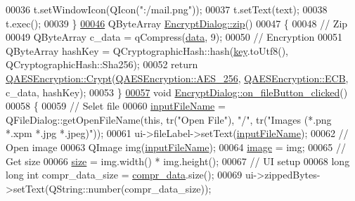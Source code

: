 \begin{DoxyCode}
00036     t.setWindowIcon(QIcon(\textcolor{stringliteral}{":/mail.png"}));
00037     t.setText(text);
00038     t.exec();
00039 \}
\hypertarget{encryptdialog_8cpp_source.tex_l00046}{}\hyperlink{class_encrypt_dialog_a2bff820a3df4ddc36ecb07ed74b7138a}{00046} QByteArray \hyperlink{class_encrypt_dialog_a2bff820a3df4ddc36ecb07ed74b7138a}{EncryptDialog::zip}()
00047 \{
00048     \textcolor{comment}{// Zip}
00049     QByteArray c\_data = qCompress(\hyperlink{class_encrypt_dialog_acf3a8bbce90d99ef17fec093c35b1008}{data}, 9);
00050     \textcolor{comment}{// Encryption}
00051     QByteArray hashKey = QCryptographicHash::hash(\hyperlink{class_encrypt_dialog_a1afdef3c665fb0d0fae06d1df8e84951}{key}.toUtf8(), QCryptographicHash::Sha256);
00052     \textcolor{keywordflow}{return} \hyperlink{class_q_a_e_s_encryption_a43819eeb6a7cb29fbd3cb6ad640dcbdf}{QAESEncryption::Crypt}(\hyperlink{class_q_a_e_s_encryption_abe48208f4f6c7d68e6a10b49b9d0b7bdacde97774ab1d4c609e04b0dd13a1e1f7}{QAESEncryption::AES\_256}, 
      \hyperlink{class_q_a_e_s_encryption_ad3e031c49a3d56566379d75b40b7b255a4ca7f51778e2adf1f464164a0ba8e75e}{QAESEncryption::ECB}, c\_data, hashKey);
00053 \}
\hypertarget{encryptdialog_8cpp_source.tex_l00057}{}\hyperlink{class_encrypt_dialog_ac9817d3f11f44f4bb8d97a228fbdf8a5}{00057} \textcolor{keywordtype}{void} \hyperlink{class_encrypt_dialog_ac9817d3f11f44f4bb8d97a228fbdf8a5}{EncryptDialog::on\_fileButton\_clicked}()
00058 \{
00059     \textcolor{comment}{// Selet file}
00060     \hyperlink{class_encrypt_dialog_a859b1bc2f032a247632b879bf8663d0b}{inputFileName} = QFileDialog::getOpenFileName(\textcolor{keyword}{this}, tr(\textcolor{stringliteral}{"Open File"}), \textcolor{stringliteral}{"/"}, tr(\textcolor{stringliteral}{"Images (*.png
       *.xpm *.jpg *.jpeg)"}));
00061     ui->fileLabel->setText(\hyperlink{class_encrypt_dialog_a859b1bc2f032a247632b879bf8663d0b}{inputFileName});
00062     \textcolor{comment}{// Open image}
00063     QImage img(\hyperlink{class_encrypt_dialog_a859b1bc2f032a247632b879bf8663d0b}{inputFileName});
00064     \hyperlink{class_encrypt_dialog_a739a0df1d28d06b28a3fd16e2bc16c73}{image} = img;
00065     \textcolor{comment}{// Get size}
00066     \hyperlink{class_encrypt_dialog_a7fff26f838ab50f807744cd2c4bed033}{size} = img.width() * img.height();
00067     \textcolor{comment}{// UI setup}
00068     \textcolor{keywordtype}{long} \textcolor{keywordtype}{long} \textcolor{keywordtype}{int} compr\_data\_size = \hyperlink{class_encrypt_dialog_a3e8998aa39696cbd1242f6420ef18143}{compr\_data}.size();
00069     ui->zippedBytes->setText(QString::number(compr\_data\_size));

\end{DoxyCode}
